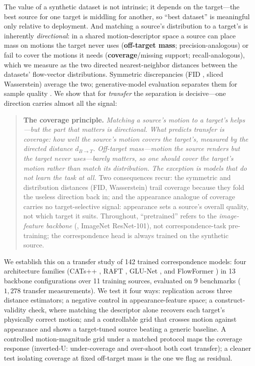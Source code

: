\documentclass[runningheads]{llncs}
\newcommand{\dbt}{d_{B\to T}}
\begin{document}
The value of a synthetic dataset is not intrinsic; it depends on the
target---the best source for one target is middling for another, so ``best
dataset'' is meaningful only relative to deployment. And matching a source's
distribution to a target's is inherently \emph{directional}: in a shared
motion-descriptor space a source can place mass on motions the target never uses
(\textbf{off-target mass}; precision-analogous) or fail to cover the motions it
needs (\textbf{coverage}/missing support; recall-analogous), which we measure as
the two directed nearest-neighbor distances between the datasets' flow-vector
distributions. Symmetric discrepancies (FID
\cite{heusel2018ganstrainedtimescaleupdate}, sliced Wasserstein) average the two;
generative-model evaluation separates them for sample quality
\cite{sajjadi2018assessing_precision_recall,kynkaanniemi2019improved_pr}. We show
that for \emph{transfer} the separation is decisive---one direction carries
almost all the signal:

\begin{quote}
\textbf{The coverage principle.} \emph{Matching a source's motion to a target's
helps---but the part that matters is directional. What predicts transfer is
\emph{coverage}: how well the source's motion covers the target's, measured by
the directed distance $\dbt$. Off-target mass---motion the source renders but
the target never uses---barely matters, so one should \emph{cover} the target's
motion rather than \emph{match} its distribution. The exception is models that do
not learn the task at all.}
Two consequences recur: the symmetric and distribution distances (FID,
Wasserstein) trail coverage because they fold the useless direction back in; and
the appearance analogue of coverage carries no target-selective signal:
appearance sets a source's overall quality, not which target it suits.
Throughout, ``pretrained'' refers to the \emph{image-feature backbone} (\eg,
ImageNet ResNet-101), not correspondence-task pre-training; the correspondence
head is always trained on the synthetic source.
\end{quote}

We establish this on a transfer study of 142 trained correspondence models:
four architecture families (CATs++ \cite{cho2022cats++}, RAFT \cite{teed2020raft},
GLU-Net \cite{truong2020glunet}, and FlowFormer \cite{huang2022flowformer}) in 13
backbone configurations over 11 training sources, evaluated on 9 benchmarks
($1{,}278$ transfer measurements). We test it four ways: replication across three
distance estimators; a negative control in appearance-feature space; a
construct-validity check, where matching the descriptor alone recovers each
target's physically correct motion; and a controllable grid that crosses motion
against appearance and shows a target-tuned source beating a generic baseline.
A controlled motion-magnitude grid under a matched protocol maps the coverage
response (inverted-U: under-coverage and over-shoot both cost transfer); a cleaner
test isolating coverage at fixed off-target mass is the one we flag as residual.
\end{document}
